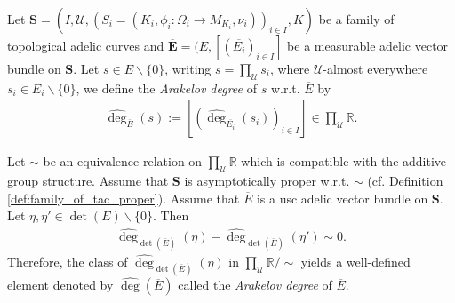 \documentclass [11pt,reqno]{amsart}
\def\bR{{\mathbb{R}}}
\newcommand{\1}{\mathmybb{1}}
\def\cU{{\mathcal{U}}}
\def\setminus{\smallsetminus}
\begin{document}

\begin{definition}
\label{def:degree_adelic_vector_bundles_families_tac}
Let $\mathbf{S}=(I,\cU,(S_{i}=(K_{i},\phi_{i}:\Omega_{i}\to M_{K_{i}},\nu_{i}))_{i\in I},K)$ be a family of topological adelic curves and $\mathbf{\overline{E}}=(E,[(\overline{E_i})_{i\in I}]$ be a measurable adelic vector bundle on $\mathbf{S}$. Let $s\in E\setminus \{0\}$, writing $s=\prod_{\cU}s_{i}$, where $\cU$-almost everywhere $s_{i}\in E_{i}\setminus\{0\}$, we define the \emph{Arakelov degree} of $s$ w.r.t. $\overline{E}$ by
\begin{align*}
\widehat{\deg}_{\overline{E}}(s) := \left[\left(\widehat{\deg}_{\overline{E_{i}}}(s_{i})\right)_{i\in I}\right]\in\displaystyle\prod_{\cU}\bR.
\end{align*}

Let $\sim$ be an equivalence relation on $\prod_{\cU}\bR$ which is compatible with the additive group structure. Assume that $\mathbf{S}$ is asymptotically proper w.r.t. $\sim$ (cf. Definition \ref{def:family_of_tac_proper}). Assume that $\overline{E}$ is a usc adelic vector bundle on $\mathbf{S}$. Let $\eta,\eta'\in \det(E)\setminus\{0\}$. Then 
\begin{align*}
\widehat{\deg}_{\det(\overline{E})}(\eta) - \widehat{\deg}_{\det(\overline{E})}(\eta') \sim 0.
\end{align*}
Therefore, the class of $\widehat{\deg}_{\det(\overline{E})}(\eta)$ in $\prod_{\cU}\bR/\sim$ yields a well-defined element denoted by $\widehat{\deg}(\overline{E})$ called the \emph{Arakelov degree} of $\overline{E}$. 
\end{definition}
\end{document}
